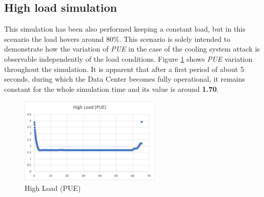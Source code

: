 \subsection{High load simulation} \label{subsection:highload}
This simulation has been also performed keeping a constant load, but in this scenario the load hovers around 80\%. This scenario is solely intended to demonstrate how the variation of \emph{PUE} in the case of the cooling system attack is observable independently of the load conditions. Figure \ref{fig:high_load_pue} shows \emph{PUE} variation throughout the simulation. It is apparent that after a first period of about 5 seconds, during which the Data Center becomes fully operational, it remains constant for the whole simulation time and its value is around \textbf{1.70}. 
\begin{figure}[h]
    \centering
    \includegraphics[width=0.6\textwidth]{chapters/images/high_load_pue.png}
    \caption{High Load (PUE)}
    \label{fig:high_load_pue}
\end{figure}


